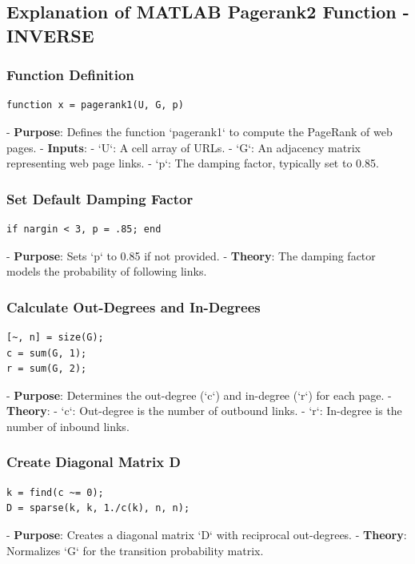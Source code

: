 \documentclass[unicode,11pt,a4paper,oneside,numbers=endperiod,openany]{scrartcl}
\begin{document}
\subsection{Explanation of MATLAB Pagerank2 Function - INVERSE}

\subsubsection{Function Definition}
\begin{lstlisting}
function x = pagerank1(U, G, p)
\end{lstlisting}
- \textbf{Purpose}: Defines the function `pagerank1` to compute the PageRank of web pages.
- \textbf{Inputs}:
  - `U`: A cell array of URLs.
  - `G`: An adjacency matrix representing web page links.
  - `p`: The damping factor, typically set to 0.85.

\subsubsection{Set Default Damping Factor}
\begin{lstlisting}
if nargin < 3, p = .85; end
\end{lstlisting}
- \textbf{Purpose}: Sets `p` to 0.85 if not provided.
- \textbf{Theory}: The damping factor models the probability of following links.

\subsubsection{Calculate Out-Degrees and In-Degrees}
\begin{lstlisting}
[~, n] = size(G);
c = sum(G, 1);
r = sum(G, 2);
\end{lstlisting}
- \textbf{Purpose}: Determines the out-degree (`c`) and in-degree (`r`) for each page.
- \textbf{Theory}:
  - `c`: Out-degree is the number of outbound links.
  - `r`: In-degree is the number of inbound links.

\subsubsection{Create Diagonal Matrix D}
\begin{lstlisting}
k = find(c ~= 0);
D = sparse(k, k, 1./c(k), n, n);
\end{lstlisting}
- \textbf{Purpose}: Creates a diagonal matrix `D` with reciprocal out-degrees.
- \textbf{Theory}: Normalizes `G` for the transition probability matrix.
\end{document}
